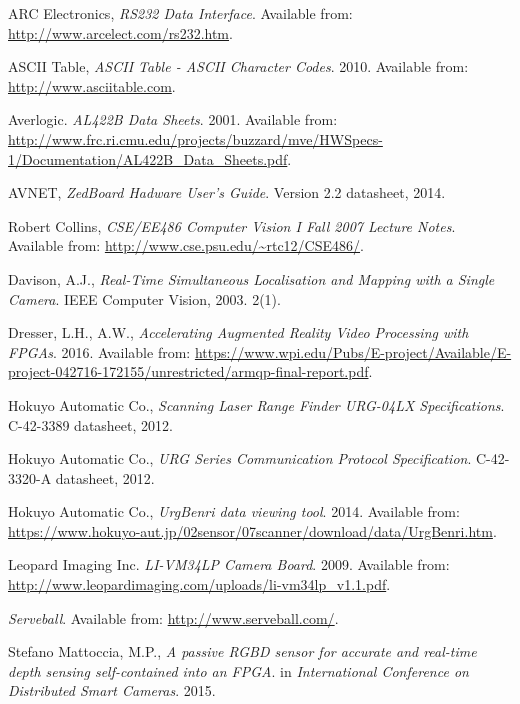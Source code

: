 \begin{thebibliography}{9}

ARC Electronics, \textit{RS232 Data Interface}. Available from: \url{http://www.arcelect.com/rs232.htm}.

ASCII Table, \textit{ASCII Table - ASCII Character Codes}. 2010. Available from: \url{http://www.asciitable.com}.

Averlogic.
\textit{AL422B Data Sheets}. 2001.
Available from: \url{http://www.frc.ri.cmu.edu/projects/buzzard/mve/HWSpecs-1/Documentation/AL422B_Data_Sheets.pdf}.

AVNET, \textit{ZedBoard Hadware User's Guide}. Version 2.2 datasheet, 2014.

Robert Collins, \textit{CSE/EE486 Computer Vision I Fall 2007 Lecture Notes}. Available from: \url{http://www.cse.psu.edu/~rtc12/CSE486/}.

Davison, A.J.,
\textit{Real-Time Simultaneous Localisation and Mapping with a Single Camera}. 
IEEE Computer Vision, 2003. 2(1).

Dresser, L.H., A.W., \textit{Accelerating Augmented Reality Video Processing with FPGAs}. 2016. Available from: \url{https://www.wpi.edu/Pubs/E-project/Available/E-project-042716-172155/unrestricted/armqp-final-report.pdf}.

Hokuyo Automatic Co., \textit{Scanning Laser Range Finder URG-04LX Specifications}. C-42-3389 datasheet, 2012.

Hokuyo Automatic Co., \textit{URG Series Communication Protocol Specification}. C-42-3320-A datasheet, 2012.

Hokuyo Automatic Co., \textit{UrgBenri data viewing tool}. 2014. Available from: \url{https://www.hokuyo-aut.jp/02sensor/07scanner/download/data/UrgBenri.htm}.

Leopard Imaging Inc.
\textit{LI-VM34LP Camera Board}. 2009.
Available from: \url{http://www.leopardimaging.com/uploads/li-vm34lp_v1.1.pdf}.

\textit{Serveball}.
Available from: \url{http://www.serveball.com/}.

Stefano Mattoccia, M.P.,
\textit{A passive RGBD sensor for accurate and real-time depth sensing self-contained into an FPGA}.
in \textit{International Conference on Distributed Smart Cameras}. 2015.


\end{thebibliography}
